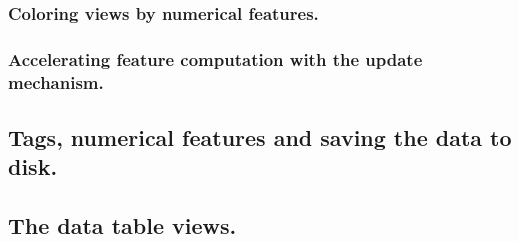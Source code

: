 \subsubsection{Coloring views by numerical features.}

\subsubsection{Accelerating feature computation with the update mechanism.}


\subsection{Tags, numerical features and saving the data to disk.}

\subsection{The data table views.}

